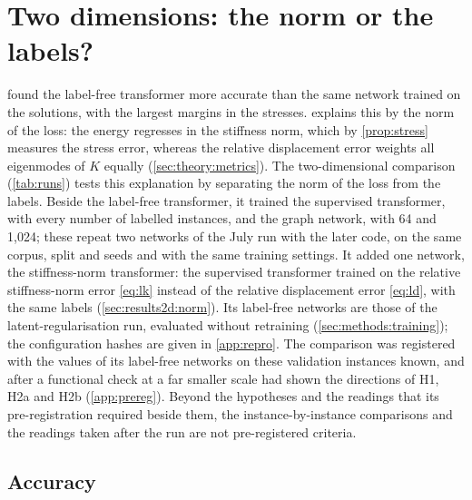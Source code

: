 \section{Two dimensions: the norm or the labels?}\label{sec:results2d}

 found the label-free transformer more accurate than the same network
trained on the solutions, with the largest margins in the stresses. 
explains this by the norm of the loss: the energy regresses in the stiffness norm, which by
\cref{prop:stress} measures the stress error, whereas the relative displacement error
weights all eigenmodes of $K$ equally (\cref{sec:theory:metrics}). The two-dimensional
comparison (\cref{tab:runs}) tests this explanation by separating the norm of the loss from
the labels. Beside the label-free transformer, it trained the supervised transformer, with
every number of labelled instances, and the graph network, with 64 and 1,024; these repeat
two networks of the July run with the later code, on the same corpus, split and seeds and
with the same training settings. It added one network, the stiffness-norm transformer: the
supervised transformer trained on the relative stiffness-norm error \eqref{eq:lk} instead of
the relative displacement error \eqref{eq:ld}, with the same labels
(\cref{sec:results2d:norm}). Its label-free networks are those of the latent-regularisation
run, evaluated without retraining (\cref{sec:methods:training}); the configuration hashes
are given in \ref{app:repro}. The comparison was registered with the values of its
label-free networks on these validation instances known, and after a functional check at a
far smaller scale had shown the directions of H1, H2a and H2b (\ref{app:prereg}). Beyond the
hypotheses and the readings that its pre-registration required beside them, the
instance-by-instance comparisons and the readings taken after the run are not pre-registered
criteria.

\subsection{Accuracy}\label{sec:results2d:accuracy}



